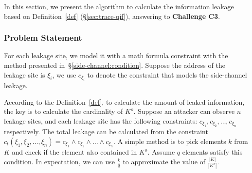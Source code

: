 

\newcommand{\addr}[1]{{l}_{#1}}
\renewcommand{\addr}[1]{{\gamma}_{#1}}
\renewcommand{\addr}[1]{{\zeta}_{#1}}
\renewcommand{\addr}[1]{{\xi}_{#1}}

In this section, we present the algorithm to calculate the information leakage
based on Definition~\ref{def} (\S\ref{sec:trace-qif}), answering to
\textbf{Challenge C3}.

\subsubsection{Problem Statement}
For each leakage site, we model it with a math formula constraint with the
method presented in~\S\ref{side-channel:condition}. Suppose the address of the
leakage site is $\addr{i}$, we use $c_{\addr{i}}$ to denote the constraint
that models the side-channel leakage. 

According to the Definition~\ref{def}, to calculate the amount of leaked
information, the key is to calculate the cardinality
of $K^o$. Suppose an attacker can observe $n$ leakage sites, and each leakage
site has the following constraints: $c_{\addr{1}}, c_{\addr{2}}, \ldots,
c_{\addr{n}}$ respectively. The total leakage can be calculated from the constraint
$c_t({\addr{1}},{\addr{2}},\ldots,{\addr{n}}) = c_{\addr{1}} \land c_{\addr{2}}
\land \ldots \land c_{\addr{n}}$. 
A simple method is to pick elements $k$ from $K$ and check if the
element also contained in $K^o$. Assume $q$ elements satisfy this condition. In
expectation, we can use $\frac{k}{q}$ to approximate the value of
$\frac{|K|}{|K^o|}$.

